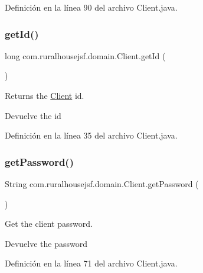Definición en la línea 90 del archivo Client.\+java.

\mbox{\label{classcom_1_1ruralhousejsf_1_1domain_1_1_client_a522bbbbe3b397983a76056b4350126df}} 
\subsubsection{\texorpdfstring{getId()}{getId()}}
{\footnotesize\ttfamily long com.\+ruralhousejsf.\+domain.\+Client.\+get\+Id (\begin{DoxyParamCaption}{ }\end{DoxyParamCaption})}



Returns the \mbox{\hyperlink{classcom_1_1ruralhousejsf_1_1domain_1_1_client}{Client}} id. 

\begin{DoxyReturn}{Devuelve}
the id 
\end{DoxyReturn}


Definición en la línea 35 del archivo Client.\+java.

\mbox{\label{classcom_1_1ruralhousejsf_1_1domain_1_1_client_a5ecd4e7fd82dec1d7348730379be6b54}} 
\subsubsection{\texorpdfstring{getPassword()}{getPassword()}}
{\footnotesize\ttfamily String com.\+ruralhousejsf.\+domain.\+Client.\+get\+Password (\begin{DoxyParamCaption}{ }\end{DoxyParamCaption})}



Get the client password. 

\begin{DoxyReturn}{Devuelve}
the password 
\end{DoxyReturn}


Definición en la línea 71 del archivo Client.\+java.

